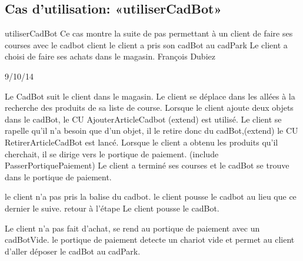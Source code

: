 \subsection{Cas d'utilisation: «utiliserCadBot» }

\startCU
\nom utiliserCadBot
\but Ce cas montre la suite de pas permettant à un client de faire ses courses avec le cadbot
\acteur client
\precondition le client a pris son cadBot au cadPark
\declenchement Le client a choisi de faire ses achats dans le magasin.
\auteur François Dubiez
\date 29/10/14

\nominal %
\startnominal
\etape[SA1] Le CadBot suit le client dans le magasin. 
\etape[RETOUR] Le client se déplace dans les allées à la recherche des produits de sa liste de course.
\etape Lorsque le client ajoute deux objets dans le cadBot, le CU AjouterArticleCadbot (extend) est utilisé.
\etape Le client se rapelle qu'il n'a besoin que d'un objet, il le retire donc du cadBot,(extend) le CU RetirerArticleCadBot est lancé.
\etape Lorsque le client a obtenu les produits qu'il cherchait, il se dirige vers le portique de paiement. (include PasserPortiquePaiement)
\stopnominal
\postcondition Le client a terminé ses courses et le cadBot se trouve dans le portique de paiement.

\alternatifs %
\startalternatif[SA1] %
\startcondition[ModeAutonome] 
  \etape le client n'a pas pris la balise du cadbot.
  \etape le client pousse le cadbot au lieu que ce dernier le suive.
  \etape retour à l'étape \in[RETOUR]
\stopcondition
\postcondition Le client pousse le cadBot.
\stopalternatif


\exception %
Le client n'a pas fait d'achat, se rend au portique de paiement avec un cadBotVide.
le portique de paiement detecte un chariot vide et permet au client d'aller déposer le cadBot au cadPark.
\stopCU
